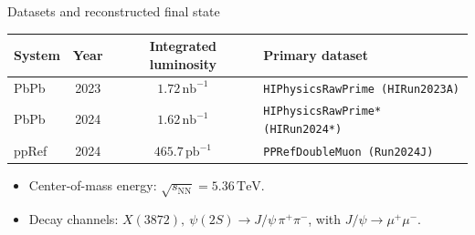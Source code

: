 \begin{frame}[label=p2]{Datasets and reconstructed final state}
  \small
  \vspace{0.35em}
  \begin{center}
    \begin{tabular}{lccl}
      \toprule
      System & Year & Integrated luminosity & Primary dataset \\
      \midrule
      PbPb  & 2023 & $1.72\,\mathrm{nb}^{-1}$  & \texttt{HIPhysicsRawPrime (HIRun2023A)} \\
      PbPb  & 2024 & $1.62\,\mathrm{nb}^{-1}$  & \texttt{HIPhysicsRawPrime* (HIRun2024*)} \\
      ppRef & 2024 & $465.7\,\mathrm{pb}^{-1}$ & \texttt{PPRefDoubleMuon (Run2024J)} \\
      \bottomrule
    \end{tabular}
  \end{center}

  \vspace{0.8em}
  \begin{itemize}
    \setlength{\itemsep}{0.65em}
    \item Center-of-mass energy:
      $\sqrt{s_{\mathrm{NN}}}=5.36\,\mathrm{TeV}$.
    \item Decay channels:
      $X(3872),\ \psi(2S)\rightarrow J/\psi\,\pi^{+}\pi^{-}$,
      with $J/\psi\rightarrow\mu^{+}\mu^{-}$.
  \end{itemize}
\end{frame}
